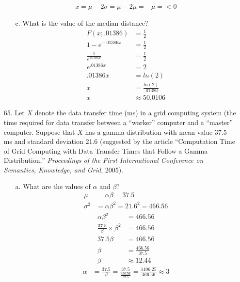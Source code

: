 \documentclass[letterpaper,12pt]{article}
\begin{document}
\begin{enumerate}
\begin{enumerate}
        \begin{align*}
          x = \mu - 2\sigma = \mu - 2\mu = -\mu = < 0
        \end{align*}
      \item[c.]
        What is the value of the median distance?
        \begin{align*}
          F(x; .01386) &= \frac{1}{2} \\
          1 - e^{-.01386x} &= \frac{1}{2} \\
          \frac{1}{e^{.01386x}} &= \frac{1}{2} \\
          e^{.01386x} &= 2 \\
          .01386x &= ln(2) \\
          x &= \frac{ln(2)}{.01386} \\
          x &\approx 50.0106
        \end{align*}
    \end{enumerate}
  \item[65.]
    Let $X$ denote the data transfer time (ms) in a grid computing system (the time required for data transfer between a ``worker'' computer and a ``master'' computer. Suppose that $X$ has a gamma distribution with mean value 37.5 ms and standard deviation 21.6 (suggested by the article ``Computation Time of Grid Computing with Data Transfer Times that Follow a Gamma Distribution,'' \textit{Proceedings of the First International Conference on Semantics, Knowledge, and Grid}, 2005).
    \begin{enumerate}
      \item[a.]
        What are the values of $\alpha$ and $\beta$?
        \begin{align*}
          \mu &= \alpha\beta = 37.5 \\
          \sigma^2 &= \alpha\beta^2 = 21.6^2 = 466.56
        \end{align*}
        \begin{align*}
          \alpha\beta^2 &= 466.56 \\
          \frac{37.5}{\beta} \times \beta^2 &= 466.56 \\
          37.5\beta &= 466.56 \\
          \beta &= \frac{466.56}{37.5} \\
          \beta &\approx 12.44
        \end{align*}
        \begin{align*}
          \alpha &= \frac{37.5}{\beta} = \frac{37.5}{\frac{466.56}{37.5}} = \frac{1406.25}{466.56} \approx 3
        \end{align*}

\end{enumerate}
\end{enumerate}
\end{document}
